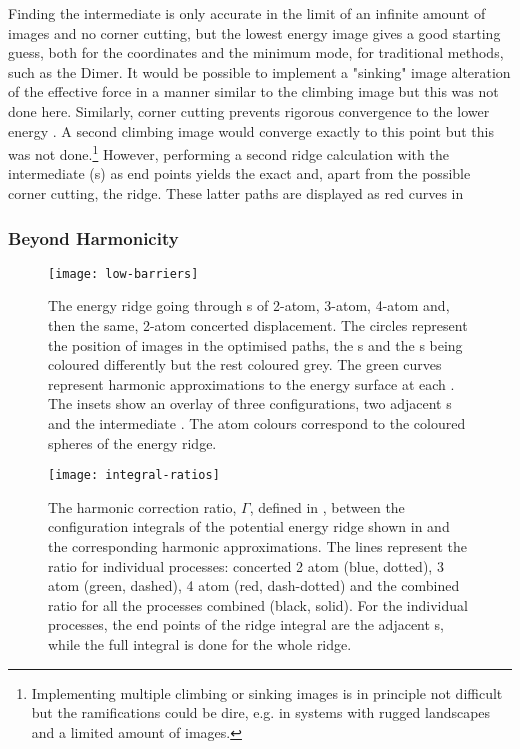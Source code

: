Finding the intermediate  is only accurate in the limit of an infinite amount of images and no corner cutting, but the lowest energy image gives a good starting guess, both for the coordinates and the minimum mode, for traditional  methods, such as the Dimer.
It would be possible to implement a "sinking" image alteration of the effective force in a manner similar to the climbing image but this was not done here.
Similarly, corner cutting prevents rigorous convergence to the lower energy .
A second climbing image would converge exactly to this point but this was not done.\footnote{Implementing multiple climbing or sinking images is in principle not difficult but the ramifications could be dire, e.g. in systems with rugged landscapes and a limited amount of images.}
However, performing a second ridge calculation with the intermediate (s) as end points yields the exact  and, apart from the possible corner cutting, the ridge.
These latter paths are displayed as red curves in 

\subsubsection{Beyond Harmonicity}
\begin{figure}[hp]
\begin{center}
\texttt{[image: low-barriers]}
    \parbox{0.85\linewidth}{
\caption{
The energy ridge going through s of 2-atom, 3-atom, 4-atom and, then the same, 2-atom concerted displacement.
The circles represent the position of images in the optimised paths, the s and the s being coloured differently but the rest coloured grey.
The green curves represent harmonic approximations to the energy surface at each .
The insets show an overlay of three configurations, two adjacent s and the intermediate .
The atom colours correspond to the coloured spheres of the energy ridge.
}
\label{fig:low-barriers}
}
\end{center}
\end{figure}

\begin{SCfigure}[5.0][h]
\centering
\texttt{[image: integral-ratios]}
\caption{
 
The harmonic correction ratio, $\Gamma$, defined in ,
between the configuration integrals of the potential energy ridge shown in  and the corresponding harmonic approximations.
The lines represent the ratio for individual processes: concerted 2 atom (blue, dotted), 3 atom (green, dashed), 4 atom (red, dash-dotted) and the combined ratio for all the processes combined (black, solid).
For the individual processes, the end points of the ridge integral are the adjacent s, while the full integral is done for the whole ridge.
}
\label{fig:integral-ratios}
\end{SCfigure}


